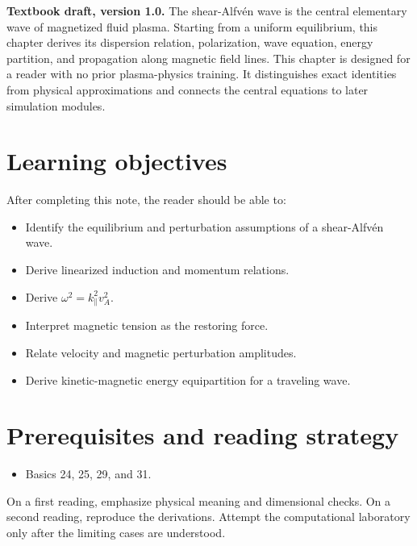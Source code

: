 \documentclass[11pt]{article}
\begin{document}

\begin{overviewbox}
\textbf{Textbook draft, version 1.0.} The shear-Alfvén wave is the central elementary wave of magnetized fluid plasma. Starting from a uniform equilibrium, this chapter derives its dispersion relation, polarization, wave equation, energy partition, and propagation along magnetic field lines. This chapter is designed for a reader with no prior plasma-physics training. It distinguishes exact identities from physical approximations and connects the central equations to later simulation modules.
\end{overviewbox}

\ProjectTOC

\section{Learning objectives}
After completing this note, the reader should be able to:
\begin{itemize}[leftmargin=1.6em]
\item Identify the equilibrium and perturbation assumptions of a shear-Alfvén wave.
\item Derive linearized induction and momentum relations.
\item Derive $\omega^2=k_\parallel^2v_A^2$.
\item Interpret magnetic tension as the restoring force.
\item Relate velocity and magnetic perturbation amplitudes.
\item Derive kinetic-magnetic energy equipartition for a traveling wave.
\end{itemize}

\section{Prerequisites and reading strategy}
\begin{itemize}[leftmargin=1.6em]
\item Basics 24, 25, 29, and 31.
\end{itemize}
On a first reading, emphasize physical meaning and dimensional checks. On a second reading, reproduce the derivations. Attempt the computational laboratory only after the limiting cases are understood.
\end{document}
